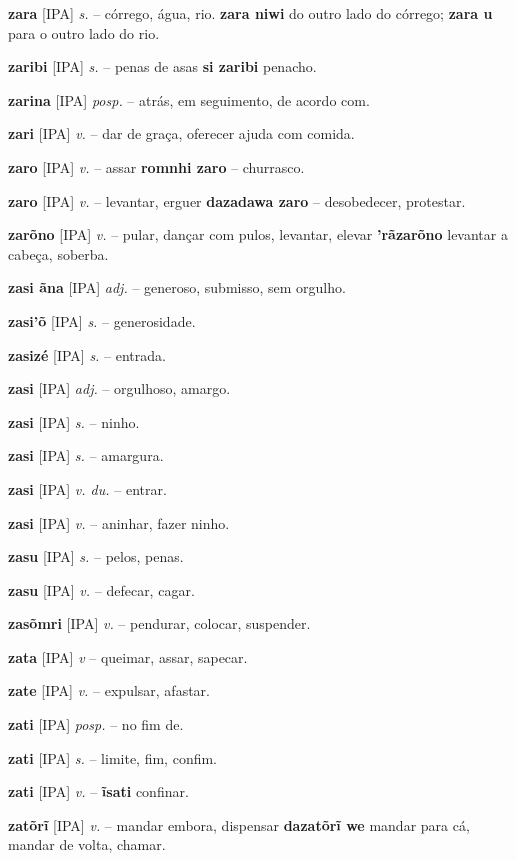 \textbf{zara} [IPA] \textit{s.} -- córrego, água, rio.  \textbf{zara niwi} do outro lado do córrego;  \textbf{zara u} para o outro lado do rio.

\textbf{zaribi} [IPA] \textit{s.} -- penas de asas  \textbf{si zaribi} penacho.

\textbf{zarina} [IPA] \textit{posp.} -- atrás, em seguimento, de acordo com.

\textbf{zari} [IPA] \textit{v.} -- dar de graça, oferecer ajuda com comida.

\textbf{zaro} [IPA] \textit{v.} -- assar  \textbf{romnhi zaro} -- churrasco.

\textbf{zaro} [IPA] \textit{v.} -- levantar, erguer  \textbf{dazadawa zaro} -- desobedecer, protestar.

\textbf{zarõno} [IPA] \textit{v.} -- pular, dançar com pulos, levantar, elevar  \textbf{'rãzarõno} levantar a cabeça, soberba.

\textbf{zasi ãna} [IPA] \textit{adj.} -- generoso, submisso, sem orgulho.

\textbf{zasi'õ} [IPA] \textit{s.} -- generosidade.

\textbf{zasizé} [IPA] \textit{s.} -- entrada.

\textbf{zasi} [IPA] \textit{adj.} -- orgulhoso, amargo.

\textbf{zasi} [IPA] \textit{s.} -- ninho.

\textbf{zasi} [IPA] \textit{s.} -- amargura.

\textbf{zasi} [IPA] \textit{v. du.} -- entrar.

\textbf{zasi} [IPA] \textit{v.} -- aninhar, fazer ninho.

\textbf{zasu} [IPA] \textit{s.} -- pelos, penas.

\textbf{zasu} [IPA] \textit{v.} -- defecar, cagar.

\textbf{zasõmri} [IPA] \textit{v.} -- pendurar, colocar, suspender.

\textbf{zata} [IPA] \textit{v} -- queimar, assar, sapecar.

\textbf{zate} [IPA] \textit{v.} -- expulsar, afastar.

\textbf{zati} [IPA] \textit{posp.} -- no fim de.

\textbf{zati} [IPA] \textit{s.} -- limite, fim, confim.

\textbf{zati} [IPA] \textit{v.} -- \textbf{ĩsati} confinar.

\textbf{zatõrĩ} [IPA] \textit{v.} -- mandar embora, dispensar  \textbf{dazatõrĩ we} mandar para cá, mandar de volta, chamar.

